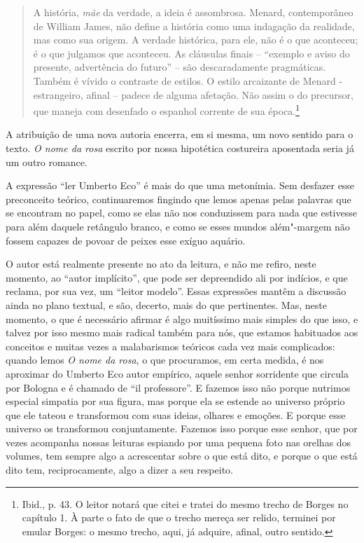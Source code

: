 \begin{quote}
A história, \emph{mãe} da verdade, a ideia é assombrosa. Menard,
contemporâneo de William James, não define a história como uma indagação
da realidade, mas como sua origem. A verdade histórica, para ele, não é
o que aconteceu; é o que julgamos que aconteceu. As cláusulas finais --
``exemplo e aviso do presente, advertência do futuro'' -- são
descaradamente pragmáticas. Também é vívido o contraste de estilos. O
estilo arcaizante de Menard - estrangeiro, afinal -- padece de alguma
afetação. Não assim o do precursor, que maneja com desenfado o espanhol
corrente de sua época.\footnote{Ibid., p. 43. O leitor notará que citei
  e tratei do mesmo trecho de Borges no capítulo 1. À parte o fato de
  que o trecho mereça ser relido, terminei por emular Borges: o mesmo
  trecho, aqui, já adquire, afinal, outro sentido.}
\end{quote}

A atribuição de uma nova autoria encerra, em si mesma, um novo sentido
para o texto. \emph{O nome da rosa} escrito por nossa hipotética
costureira aposentada seria já um outro romance.

A expressão ``ler Umberto Eco'' é mais do que uma metonímia. Sem
desfazer esse preconceito teórico, continuaremos fingindo que lemos
apenas pelas palavras que se encontram no papel, como se elas não nos
conduzissem para nada que estivesse para além daquele retângulo branco,
e como se esses mundos além"-margem não fossem capazes de povoar de
peixes esse exíguo aquário.

O autor está realmente presente no ato da leitura, e não me refiro,
neste momento, ao ``autor implícito'', que pode ser depreendido ali por
indícios, e que reclama, por sua vez, um ``leitor modelo''. Essas
expressões mantêm a discussão ainda no plano textual, e são, decerto,
mais do que pertinentes. Mas, neste momento, o que é necessário afirmar
é algo muitíssimo mais simples do que isso, e talvez por isso mesmo mais
radical também para nós, que estamos habituados aos conceitos e muitas
vezes a malabarismos teóricos cada vez mais complicados: quando lemos
\emph{O nome da rosa}, o que procuramos, em certa medida, é nos
aproximar do Umberto Eco autor empírico, aquele senhor sorridente que
circula por Bologna e é chamado de ``il professore''. E fazemos isso não
porque nutrimos especial simpatia por sua figura, mas porque ela se
estende ao universo próprio que ele tateou e transformou com suas
ideias, olhares e emoções. E porque esse universo os transformou
conjuntamente. Fazemos isso porque esse senhor, que por vezes acompanha
nossas leituras espiando por uma pequena foto nas orelhas dos volumes,
tem sempre algo a acrescentar sobre o que está dito, e porque o que está
dito tem, reciprocamente, algo a dizer a seu respeito.

